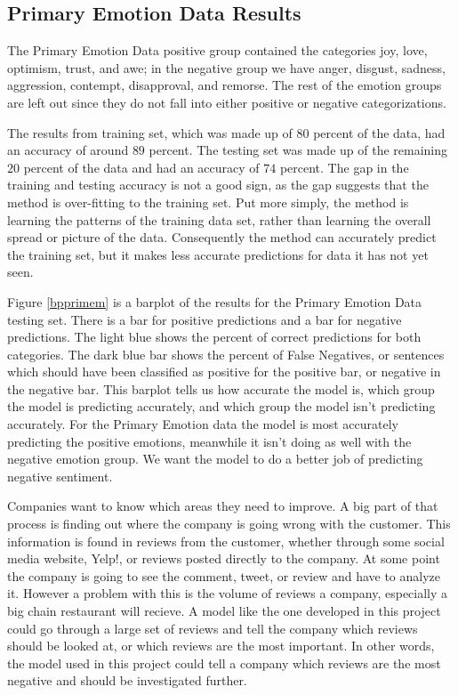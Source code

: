 \documentclass[titlepage,letterpaper]{article}
\begin{document}
\subsection{Primary Emotion Data Results}
The Primary Emotion Data positive group contained the categories joy, love, optimism, trust, and awe; in the negative group we have anger, disgust, sadness, aggression, contempt, disapproval, and remorse. The rest of the emotion groups are left out since they do not fall into either positive or negative categorizations.

The results from training set, which was made up of $80$ percent of the data, had an accuracy of around $89$ percent. The testing set was made up of the remaining $20$ percent of the data and had an accuracy of $74$ percent. The gap in the training and testing accuracy is not a good sign, as the gap suggests that the method is over-fitting to  the training set. Put more simply, the method is learning the patterns of the training data set, rather than learning the overall spread or picture of the data. Consequently the method can accurately predict the training set, but it makes less accurate predictions for data it has not yet seen.

Figure \ref{bpprimem} is a barplot of the results for the Primary Emotion Data testing set. There is a bar for positive predictions and a bar for negative predictions. The light blue shows the percent of correct predictions for both categories. The dark blue bar shows the percent of False Negatives, or sentences which should have been classified as positive for the positive bar, or negative in the negative bar. This barplot tells us how accurate the model is, which group the model is predicting accurately, and which group the model isn't predicting accurately. For the Primary Emotion data the model is most accurately predicting the positive emotions, meanwhile it isn't doing as well with the negative emotion group. We want the model to do a better job of predicting negative sentiment. 

Companies want to know which areas they need to improve. A big part of that process is finding out where the company is going wrong with the customer. This information is found in reviews from the customer, whether through some social media website, Yelp!, or reviews posted directly to the company. At some point the company is going to see the comment, tweet, or review and have to analyze it. However a problem with this is the volume of reviews a company, especially a big chain restaurant will recieve. A model like the one developed in this project could go through a large set of reviews and tell the company which reviews should be looked at, or which reviews are the most important. In other words, the model used in this project could tell a company which reviews are the most negative and should be investigated further.   
\end{document}
